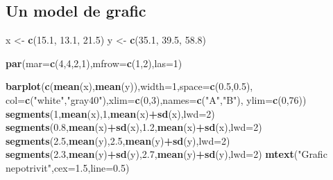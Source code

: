 \documentclass[]{article}
\newenvironment{Shaded}{\begin{snugshade}}{\end{snugshade}}
\newcommand{\KeywordTok}[1]{\textcolor[rgb]{0.13,0.29,0.53}{\textbf{#1}}}
\newcommand{\DataTypeTok}[1]{\textcolor[rgb]{0.13,0.29,0.53}{#1}}
\newcommand{\DecValTok}[1]{\textcolor[rgb]{0.00,0.00,0.81}{#1}}
\newcommand{\FloatTok}[1]{\textcolor[rgb]{0.00,0.00,0.81}{#1}}
\newcommand{\StringTok}[1]{\textcolor[rgb]{0.31,0.60,0.02}{#1}}
\newcommand{\OperatorTok}[1]{\textcolor[rgb]{0.81,0.36,0.00}{\textbf{#1}}}
\newcommand{\NormalTok}[1]{#1}
\begin{document}
\subsection{Un model de grafic}\label{un-model-de-grafic}

\begin{Shaded}
\begin{Highlighting}[]
\NormalTok{x <-}\StringTok{ }\KeywordTok{c}\NormalTok{(}\FloatTok{15.1}\NormalTok{, }\FloatTok{13.1}\NormalTok{, }\FloatTok{21.5}\NormalTok{)}
\NormalTok{y <-}\StringTok{ }\KeywordTok{c}\NormalTok{(}\FloatTok{35.1}\NormalTok{, }\FloatTok{39.5}\NormalTok{, }\FloatTok{58.8}\NormalTok{)}

\KeywordTok{par}\NormalTok{(}\DataTypeTok{mar=}\KeywordTok{c}\NormalTok{(}\DecValTok{4}\NormalTok{,}\DecValTok{4}\NormalTok{,}\DecValTok{2}\NormalTok{,}\DecValTok{1}\NormalTok{),}\DataTypeTok{mfrow=}\KeywordTok{c}\NormalTok{(}\DecValTok{1}\NormalTok{,}\DecValTok{2}\NormalTok{),}\DataTypeTok{las=}\DecValTok{1}\NormalTok{)}

\KeywordTok{barplot}\NormalTok{(}\KeywordTok{c}\NormalTok{(}\KeywordTok{mean}\NormalTok{(x),}\KeywordTok{mean}\NormalTok{(y)),}\DataTypeTok{width=}\DecValTok{1}\NormalTok{,}\DataTypeTok{space=}\KeywordTok{c}\NormalTok{(}\FloatTok{0.5}\NormalTok{,}\FloatTok{0.5}\NormalTok{),}
        \DataTypeTok{col=}\KeywordTok{c}\NormalTok{(}\StringTok{"white"}\NormalTok{,}\StringTok{"gray40"}\NormalTok{),}\DataTypeTok{xlim=}\KeywordTok{c}\NormalTok{(}\DecValTok{0}\NormalTok{,}\DecValTok{3}\NormalTok{),}\DataTypeTok{names=}\KeywordTok{c}\NormalTok{(}\StringTok{"A"}\NormalTok{,}\StringTok{"B"}\NormalTok{),}
        \DataTypeTok{ylim=}\KeywordTok{c}\NormalTok{(}\DecValTok{0}\NormalTok{,}\DecValTok{76}\NormalTok{))}
\KeywordTok{segments}\NormalTok{(}\DecValTok{1}\NormalTok{,}\KeywordTok{mean}\NormalTok{(x),}\DecValTok{1}\NormalTok{,}\KeywordTok{mean}\NormalTok{(x)}\OperatorTok{+}\KeywordTok{sd}\NormalTok{(x),}\DataTypeTok{lwd=}\DecValTok{2}\NormalTok{)}
\KeywordTok{segments}\NormalTok{(}\FloatTok{0.8}\NormalTok{,}\KeywordTok{mean}\NormalTok{(x)}\OperatorTok{+}\KeywordTok{sd}\NormalTok{(x),}\FloatTok{1.2}\NormalTok{,}\KeywordTok{mean}\NormalTok{(x)}\OperatorTok{+}\KeywordTok{sd}\NormalTok{(x),}\DataTypeTok{lwd=}\DecValTok{2}\NormalTok{)}
\KeywordTok{segments}\NormalTok{(}\FloatTok{2.5}\NormalTok{,}\KeywordTok{mean}\NormalTok{(y),}\FloatTok{2.5}\NormalTok{,}\KeywordTok{mean}\NormalTok{(y)}\OperatorTok{+}\KeywordTok{sd}\NormalTok{(y),}\DataTypeTok{lwd=}\DecValTok{2}\NormalTok{)}
\KeywordTok{segments}\NormalTok{(}\FloatTok{2.3}\NormalTok{,}\KeywordTok{mean}\NormalTok{(y)}\OperatorTok{+}\KeywordTok{sd}\NormalTok{(y),}\FloatTok{2.7}\NormalTok{,}\KeywordTok{mean}\NormalTok{(y)}\OperatorTok{+}\KeywordTok{sd}\NormalTok{(y),}\DataTypeTok{lwd=}\DecValTok{2}\NormalTok{)}
\KeywordTok{mtext}\NormalTok{(}\StringTok{"Grafic nepotrivit"}\NormalTok{,}\DataTypeTok{cex=}\FloatTok{1.5}\NormalTok{,}\DataTypeTok{line=}\FloatTok{0.5}\NormalTok{)}


\end{Highlighting}
\end{Shaded}
\end{document}
